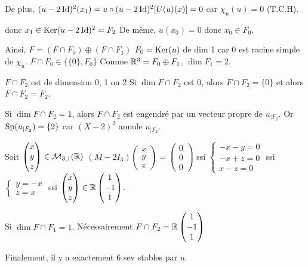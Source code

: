 \begin{solution}
De plus, $(u-2\operatorname{Id})^2(x_1) = u \circ (u-2\operatorname{Id})^2 [U(u)(x)] = 0$
car $\chi_u(u) = 0$ (T.C.H).

donc $x_1 \in \operatorname{Ker}(u-2\operatorname{Id})^2 = F_2$
De même, $u(x_0) = 0$ donc $x_0 \in F_0$.

Ainsi, $F = (F \cap F_0) \oplus (F \cap F_1)$
$F_0 = \operatorname{Ker}(u)$ de dim 1 car 0 est racine simple de $\chi_u$.
$F \cap F_0 \in \{\{0\}, F_0\}$
Comme $\mathbb R^3 = F_0 \oplus F_1$, $\dim F_1 = 2$.

$F \cap F_2$ est de dimension 0, 1 ou 2
Si $\dim F \cap F_2$ est 0, alors $F \cap F_2 = \{0\}$ et alors $F \cap F_2 = F_2$.

Si $\dim F \cap F_2 = 1$, alors $F \cap F_2$ est engendré par un vecteur propre de $u_{|F_2}$.
Or $\operatorname{Sp}(u_{|F_2}) = \{2\}$ car $(X-2)^2$ annule $u_{|F_2}$.

Soit $\begin{pmatrix} x \\ y \\ z \end{pmatrix} \in \mathcal M_{3,1}(\mathbb R)$
$(M - 2I_3) \begin{pmatrix} x \\ y \\ z \end{pmatrix} = \begin{pmatrix} 0 \\ 0 \\ 0 \end{pmatrix}$ ssi $\begin{cases} -x - y = 0 \\ -x + z = 0 \\ x - z = 0 \end{cases}$ ssi $\begin{cases} y = -x \\ z = x \end{cases}$
ssi $\begin{pmatrix} x \\ y \\ z \end{pmatrix} \in \mathbb R \begin{pmatrix} 1 \\ -1 \\ 1 \end{pmatrix}$.

Si $\dim F \cap F_1 = 1$,
Nécessairement $F \cap F_2 = \mathbb R \begin{pmatrix} 1 \\ -1 \\ 1 \end{pmatrix}$

Finalement, il y a exactement 6 sev stables par $u$.
\end{solution}

